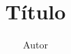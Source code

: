 \documentclass[a4paper,10pt]{article}
\title{Título}
\author{Autor}
\begin{document}

\disciplina
{}
  
\exercicio \lipsum[1]
\exercicio \lipsum[1-3]

\begin{respostas}
  \exercicio \lipsum[1-2]
  \exercicio \lipsum[3-4]
\end{respostas}

\begin{resolucoes}
  \exercicio \lipsum[5-6]
  \exercicio \lipsum[7-8]
\end{resolucoes}
\end{document}
